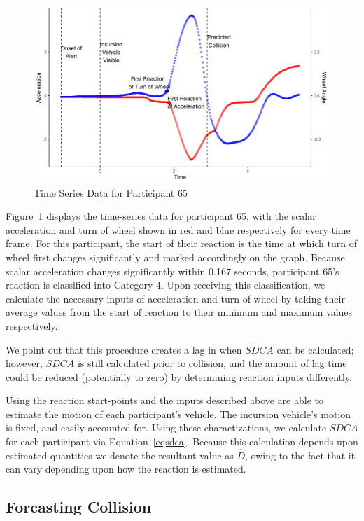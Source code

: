 \documentclass{article}
\begin{document}
\begin{figure}[h!]
\includegraphics[width=\textwidth]{fig1.png}
\caption{Time Series Data for Participant 65}
\label{figure 1}
\end{figure}

Figure~\ref{figure 1} displays the time-series data for participant 65, with the scalar acceleration and turn of wheel shown in red and blue respectively for every time frame. For this participant, the start of their reaction is the time at which turn of wheel first changes significantly and marked accordingly on the graph. Because scalar acceleration changes significantly within 0.167 seconds, participant 65's reaction is classified into Category 4. Upon receiving this classification, we calculate the necessary inputs of acceleration and turn of wheel by taking their average values from the start of reaction to their minimum and maximum values respectively. 

We point out that this procedure creates a lag in when $SDCA$ can be calculated; however, $SDCA$ is still calculated prior to collision, and the amount of lag time could be reduced (potentially to zero) by determining reaction inputs differently.

Using the reaction start-points and the inputs described above are able to estimate the motion of each participant's vehicle. The incursion vehicle's motion is fixed, and easily accounted for. Using these charactizations, we calculate $SDCA$ for each participant via Equation~\eqref{eqsdca}. Because this calculation depends upon estimated quantities we denote the resultant value as $\hat{D}$, owing to the fact that it can vary depending upon how the reaction is estimated.  

\subsection{Forcasting Collision}
\end{document}
